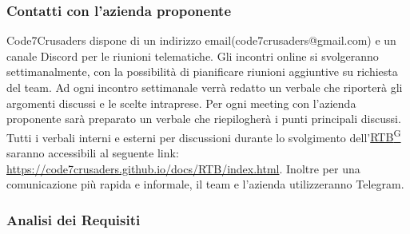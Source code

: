\subsubsection{Contatti con l’azienda proponente}
Code7Crusaders dispone di un indirizzo email(code7crusaders@gmail.com) e un canale Discord per le riunioni telematiche. 
Gli incontri online si svolgeranno settimanalmente, con la possibilità di pianificare riunioni aggiuntive su richiesta del team.
Ad ogni incontro settimanale verrà redatto un verbale che riporterà gli argomenti discussi e le scelte intraprese.
Per ogni meeting con l’azienda proponente sarà preparato un verbale che riepilogherà i punti principali discussi. 
Tutti i verbali interni e esterni per discussioni durante lo svolgimento dell'\href{https://code7crusaders.github.io/docs/RTB/documentazione_interna/glossario.html#rtb-requirements-and-technology-baseline}{RTB\textsuperscript{G}} saranno accessibili al seguente link: \url{https://code7crusaders.github.io/docs/RTB/index.html}.
Inoltre per una comunicazione più rapida e informale, il team e l'azienda utilizzeranno Telegram.

\subsubsection{Analisi dei Requisiti}

